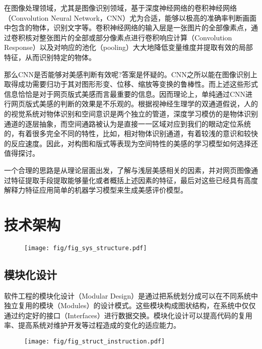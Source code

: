 在图像处理领域，尤其是图像识别领域，基于深度神经网络的卷积神经网络（Convolution Neural Network，CNN）尤为合适，能够以极高的准确率判断画面中包含的物体，识别文字等。卷积神经网络的输入层是一张图片的全部像素点，通过卷积核对整张图片的全部或部分像素点进行卷积响应计算（Convolution Response）以及对响应的池化（pooling）大大地降低变量维度并提取有效的局部特征，从而识别特定的物体。

那么CNN是否能够对美感判断有效呢?答案是怀疑的。CNN之所以能在图像识别上取得成功需要归功于其对图形形变、位移、缩放等变换的鲁棒性。而上述这些形式信息恰恰是对于网页版式美感而言最重要的信息。因而理论上，单纯通过CNN进行网页版式美感的判断的效果是不乐观的。根据视神经生理学的双通道假说，人的的视觉系统对物体识别和空间意识是两个独立的管道，深度学习模仿的是物体识别通道的逐层抽象，而空间通路被认为是直接一一区域对应到我们的眼动定位系统的，有着很多完全不同的特性，比如，相对物体识别通道，有着较浅的意识和较快的反应速度。因此，对构图和版式等表现为空间特性的美感的学习模型如何选择还值得探讨。

一个合理的思路是从理论层面出发，了解与浅层美感相关的因素，并对网页图像通过特征提取手段提取能够量化或者概括上述因素的特征，最后对这些已经具有高度解释力特征应用简单的机器学习模型来生成美感评价模型。

\section{技术架构}
\begin{figure}[H]
  \texttt{[image: fig/fig\_sys\_structure.pdf]}
\end{figure}
\subsection{模块化设计}

软件工程的模块化设计（Modular Design）是通过把系统划分成可以在不同系统中独立复用的模块（Modules）的设计模式。这些模块构成图状结构，在系统中仅仅通过约定好的接口（Interfaces）进行数据交换。模块化设计可以提高代码的复用率、提高系统对维护开发等过程造成的变化的适应能力。

\begin{figure}[H]
  \center
  \texttt{[image: fig/fig\_struct\_instruction.pdf]}
\end{figure}

